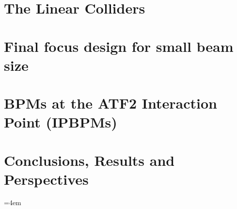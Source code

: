 \documentclass[logos,hyperref,mainlanguage=french,morelanguage=english]{my-orsay-thesis}
\begin{document}
\part{The Linear Colliders}



\part{Final focus design for small beam size}



\newpage
\part{BPMs at the ATF2 Interaction Point (IPBPMs)}

% 


\part{Conclusions, Results and Perspectives}

\appendix


\thispagestyle{empty}
\strut\newpage
{}=4em
\addtolength\leftskip{25pt}
\setlength{}
\addtolength\parskip{\smallskipamount}
\printbibliography
\end{document}
